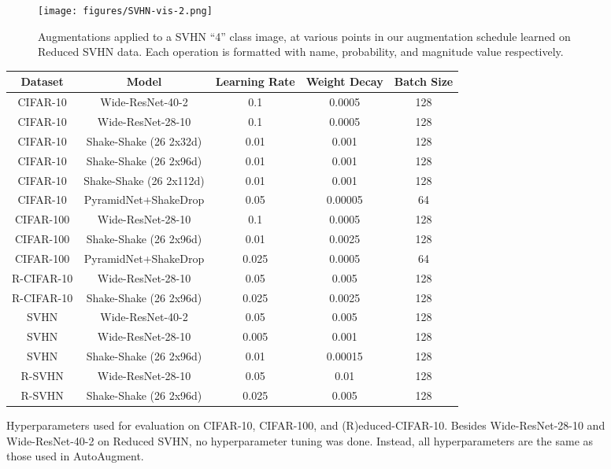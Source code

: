 \documentclass{article}
\begin{document}
\begin{figure}[t]
{\begin{figure}[t]
  \centering
  \texttt{[image: figures/SVHN-vis-2.png]}
  \caption{Augmentations applied to a SVHN ``4'' class image, at various points in our augmentation schedule learned on Reduced SVHN data. Each operation is formatted with name, probability, and magnitude value respectively.} \label{fig:svhn-viz}
\end{figure}

\begin{table*}[t]
\caption{Hyperparameters used for evaluation on CIFAR-10, CIFAR-100, and (R)educed-CIFAR-10. Besides Wide-ResNet-28-10 and Wide-ResNet-40-2 on Reduced SVHN, no hyperparameter tuning was done. Instead, all hyperparameters are the same as those used in AutoAugment.}
\label{table-hp-cifar10}
\vskip 0.15in
\begin{center}
\begin{small}
\begin{tabular}{ccccc}
\toprule
Dataset & Model & Learning Rate & Weight Decay & Batch Size \\
\midrule
CIFAR-10 & Wide-ResNet-40-2    &   0.1 & 0.0005 & 128 \\
CIFAR-10 & Wide-ResNet-28-10    &   0.1 & 0.0005 & 128 \\
CIFAR-10 & Shake-Shake (26 2x32d) & 0.01 & 0.001 & 128 \\
CIFAR-10 & Shake-Shake (26 2x96d) & 0.01 & 0.001 & 128 \\
CIFAR-10 & Shake-Shake (26 2x112d) & 0.01 & 0.001 & 128 \\
CIFAR-10 & PyramidNet+ShakeDrop   & 0.05 & 0.00005 & 64 \\
CIFAR-100 & Wide-ResNet-28-10    &   0.1 & 0.0005 & 128 \\
CIFAR-100 & Shake-Shake (26 2x96d) & 0.01 & 0.0025 & 128 \\
CIFAR-100 & PyramidNet+ShakeDrop   & 0.025 & 0.0005 & 64 \\
R-CIFAR-10 & Wide-ResNet-28-10    &   0.05 & 0.005 & 128 \\
R-CIFAR-10 & Shake-Shake (26 2x96d) & 0.025 & 0.0025 & 128 \\
SVHN & Wide-ResNet-40-2    &   0.05 & 0.005 & 128 \\
SVHN & Wide-ResNet-28-10 & 0.005 & 0.001 & 128 \\
SVHN & Shake-Shake (26 2x96d) & 0.01 & 0.00015 & 128 \\
R-SVHN & Wide-ResNet-28-10 & 0.05 & 0.01 & 128 \\
R-SVHN & Shake-Shake (26 2x96d) & 0.025 & 0.005 & 128 \\

\end{tabular}
\end{small}
\end{center}
\end{table*}}
\end{figure}
\end{document}
